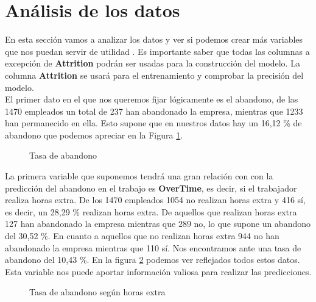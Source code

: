 \section{Análisis de los datos}
En esta sección vamos a analizar los datos y ver si podemos crear más variables que nos puedan servir de utilidad  \cite{bowles_2015}.
Es importante saber que todas las columnas a excepción de \textbf{Attrition} podrán ser usadas para la construcción del modelo. 
La columna \textbf{Attrition} se usará para el entrenamiento y comprobar la precisión del modelo.\\

El primer dato en el que nos queremos fijar lógicamente es el abandono, de las 1470 empleados un total de 237 han abandonado la empresa, mientras que 1233 han permanecido en ella.
Esto supone que en nuestros datos hay un 16,12 \% de abandono que podemos apreciar en la Figura \ref{fig:attrition}.\\

\begin{figure}
\centering
{}
\caption{Tasa de abandono}
\label{fig:attrition}
\end{figure}


La primera variable que suponemos tendrá una gran relación con con la predicción del abandono en el trabajo es \textbf{OverTime}, es decir, si el trabajador realiza horas extra.
De los 1470 empleados 1054 no realizan horas extra y 416 sí, es decir, un 28,29 \% realizan horas extra.
De aquellos que realizan horas extra 127 han abandonado la empresa mientras que 289 no, lo que supone un abandono del 30,52 \%.
En cuanto a aquellos que no realizan horas extra 944 no han abandonado la empresa mientras que 110 sí. Nos encontramos ante una tasa de abandono del 10,43 \%. En la figura \ref{fig:attrition_overtime} podemos ver reflejados todos estos datos.\\

Esta variable nos puede aportar información valiosa para realizar las predicciones.\\

\begin{figure}
\centering
{}
\qquad
{}
\caption{Tasa de abandono según horas extra}
\label{fig:attrition_overtime}
\end{figure}

